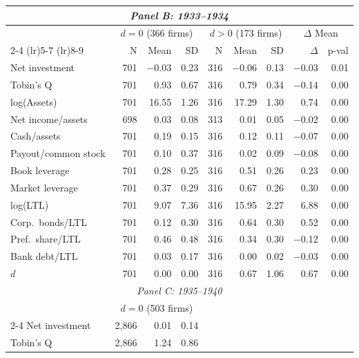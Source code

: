 \begin{table}[p]
\begin{threeparttable}
\begin{tabular}{l rrr rrr rr}
            \multicolumn{9}{c}{\textit{Panel B: 1933--1934}} \\
            \midrule
             & \multicolumn{3}{c}{$d = 0$ (366 firms)} & \multicolumn{3}{c}{$d > 0$ (173 firms)} & \multicolumn{2}{c}{$\Delta$ Mean} \\
            \cmidrule(lr){2-4} \cmidrule(lr){5-7} \cmidrule(lr){8-9}
             & N & Mean & SD & N & Mean & SD & $\Delta$ & p-val \\
            Net investment & 701 & $-$0.03 & 0.23 & 316 & $-$0.06 & 0.13 & $-$0.03 & 0.01 \\
            Tobin's Q & 701 & 0.93 & 0.67 & 316 & 0.79 & 0.34 & $-$0.14 & 0.00 \\
            log(Assets) & 701 & 16.55 & 1.26 & 316 & 17.29 & 1.30 & 0.74 & 0.00 \\
            Net income/assets & 698 & 0.03 & 0.08 & 313 & 0.01 & 0.05 & $-$0.02 & 0.00 \\
            Cash/assets & 701 & 0.19 & 0.15 & 316 & 0.12 & 0.11 & $-$0.07 & 0.00 \\
            Payout/common stock & 701 & 0.10 & 0.37 & 316 & 0.02 & 0.09 & $-$0.08 & 0.00 \\
            Book leverage & 701 & 0.28 & 0.25 & 316 & 0.51 & 0.26 & 0.23 & 0.00 \\
            Market leverage & 701 & 0.37 & 0.29 & 316 & 0.67 & 0.26 & 0.30 & 0.00 \\
            log(LTL) & 701 & 9.07 & 7.36 & 316 & 15.95 & 2.27 & 6.88 & 0.00 \\
            Corp.\ bonds/LTL & 701 & 0.12 & 0.30 & 316 & 0.64 & 0.30 & 0.52 & 0.00 \\
            Pref.\ share/LTL & 701 & 0.46 & 0.48 & 316 & 0.34 & 0.30 & $-$0.12 & 0.00 \\
            Bank debt/LTL & 701 & 0.03 & 0.17 & 316 & 0.00 & 0.02 & $-$0.03 & 0.00 \\
            \ensuremath{d} & 701 & 0.00 & 0.00 & 316 & 0.67 & 1.06 & 0.67 & 0.00 \\
            \midrule
            \multicolumn{9}{c}{\textit{Panel C: 1935--1940}} \\
            \midrule
             & \multicolumn{3}{c}{$d = 0$ (503 firms)} & \multicolumn{3}{c}{} & \multicolumn{2}{c}{} \\
            \cmidrule(lr){2-4}
            Net investment & 2,866 & 0.01 & 0.14 &  &  &  &  &  \\
            Tobin's Q & 2,866 & 1.24 & 0.86 &  &  &  &  &  \\

\end{tabular}
\end{threeparttable}
\end{table}
